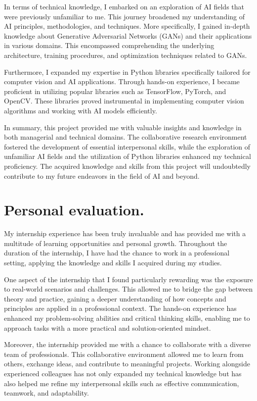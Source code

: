 In terms of technical knowledge, I embarked on an exploration of AI fields that were previously unfamiliar to me. 
This journey broadened my understanding of AI principles, methodologies, and techniques. 
More specifically, I gained in-depth knowledge about Generative Adversarial Networks (GANs) and their applications in various domains. 
This encompassed comprehending the underlying architecture, training procedures, and optimization techniques related to GANs.

Furthermore, I expanded my expertise in Python libraries specifically tailored for computer vision and AI applications. 
Through hands-on experience, I became proficient in utilizing popular libraries such as TensorFlow, PyTorch, and OpenCV.\@
These libraries proved instrumental in implementing computer vision algorithms and working with AI models efficiently.

In summary, this project provided me with valuable insights and knowledge in both managerial and technical domains. 
The collaborative research environment fostered the development of essential interpersonal skills, while the exploration of unfamiliar AI fields and the utilization of Python libraries enhanced my technical proficiency. 
The acquired knowledge and skills from this project will undoubtedly contribute to my future endeavors in the field of AI and beyond.
\section{Personal evaluation.}
My internship experience has been truly invaluable and has provided me with a multitude of learning opportunities and personal growth. 
Throughout the duration of the internship, I have had the chance to work in a professional setting, applying the knowledge and skills I acquired during my studies.

One aspect of the internship that I found particularly rewarding was the exposure to real-world scenarios and challenges. This allowed me to bridge the gap between theory and practice, gaining a deeper understanding of how concepts and principles are applied in a professional context. 
The hands-on experience has enhanced my problem-solving abilities and critical thinking skills, enabling me to approach tasks with a more practical and solution-oriented mindset.

Moreover, the internship provided me with a chance to collaborate with a diverse team of professionals. This collaborative environment allowed me to learn from others, exchange ideas, and contribute to meaningful projects. 
Working alongside experienced colleagues has not only expanded my technical knowledge but has also helped me refine my interpersonal skills such as effective communication, teamwork, and adaptability.

